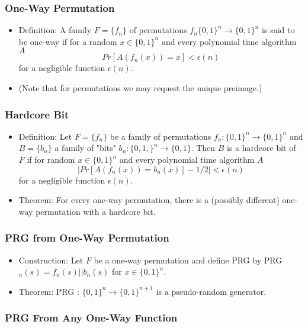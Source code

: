\documentclass[a4paper]{scrartcl}
\begin{document}
\subsubsection*{One-Way Permutation}

\begin{itemize}
\item Definition: A family $F = \{f_n\}$ of permutations $f_n \{0,1\}^n \rightarrow \{0,1\}^n$ is said to be one-way if for a random $x \in \{0,1\}^n$ and every polynomial time algorithm $A$ $$Pr[A(f_n(x)) = x] < \epsilon(n)$$ for a negligible function $\epsilon(n)$.
\item (Note that for permutations we may request the unique preimage.)
\end{itemize}

\subsubsection*{Hardcore Bit}

\begin{itemize}
\item Definition: Let $F = \{f_n\}$ be a family of permutations $f_n : \{0,1\}^n \rightarrow \{0,1\}^n$ and $B = \{b_n\}$ a family of "bits" $b_n : \{0,1,\}^n \rightarrow \{0,1\}$. Then $B$ is a hardcore bit of $F$ if for random $x \in \{0,1\}^n$ and every polynomial time algorithm $A$ $$|Pr[A(f_n(x)) = b_n(x)] - 1/2| < \epsilon(n)$$ for a negligible function $\epsilon(n)$.
\item Theorem: For every one-way permutation, there is a (possibly different) one-way permutation with a hardcore bit.
\end{itemize}

\subsubsection*{PRG from One-Way Permutation}

\begin{itemize}
\item Construction: Let $F$ be a one-way permutation and define PRG by PRG$_n(s) = f_n(s)||b_n(s)$ for $x \in \{0,1\}^n$.
\item Theorem: PRG : $\{0,1\}^n \rightarrow \{0,1\}^{n+1}$ is a pseudo-random generator.
\end{itemize}

\subsubsection*{PRG From Any One-Way Function}
\end{document}
